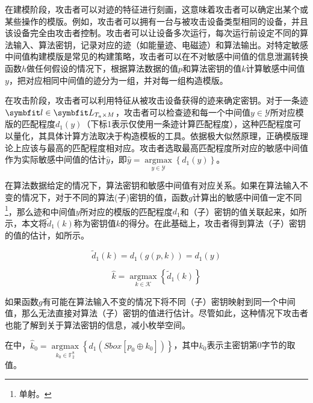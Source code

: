 {	在建模阶段，攻击者可以对迹的特征进行刻画，这意味着攻击者可以确定出某个或某些操作的模版。例如，攻击者可以拥有一台与被攻击设备类型相同的设备，并且该设备完全由攻击者控制。攻击者可以让设备多次运行，每次运行前设定不同的算法输入、算法密钥，记录对应的迹（如能量迹、电磁迹）和算法输出。对特定敏感中间值构建模版是常见的构建策略，攻击者可以在不对敏感中间值的信息泄漏转换函数$h$做任何假设的情况下，根据算法数据的值$p$和算法密钥的值$k$计算敏感中间值$y$，把对应相同中间值的迹分为一组，并对每一组构造模版。
	
	在攻击阶段，攻击者可以利用特征从被攻击设备获得的迹来确定密钥。对于一条迹$\Vector l\in \Vector L_{T_a\times M}$，攻击者可以检查迹和每一个中间值$y\in\mathcal Y$所对应模版的匹配程度$d_1(y)$（下标1表示仅使用一条迹计算匹配程度），这种匹配程度可以量化，其具体计算方法取决于构造模板的工具。依据极大似然原理，正确模版理论上应该与最高的匹配程度相对应\citep{Kay1998}。攻击者选取最高匹配程度所对应的敏感中间值作为实际敏感中间值的估计$\hat y$，即$\hat y=\mathop{\mathrm{argmax}}\limits_{y\in\mathcal Y}\left\lbrace d_1(y)\right\rbrace $。
	
	在算法数据给定的情况下，算法密钥和敏感中间值有对应关系。如果在算法输入不变的情况下，对于不同的算法(子)密钥的值，函数$g$计算出的敏感中间值一定不同\footnote{单射。}，那么迹和中间值$y$所对应的模版的匹配程度$d_1$和（子）密钥的值关联起来，如所示，本文将$\tilde d_1(k)$称为密钥值$k$的得分。在此基础上，攻击者得到算法（子）密钥的值的估计，如所示。
	
	\begin{equation}\label{eq:gsup-1}
		\tilde d_1(k)=d_1\left(g(p,k) \right)=d_1(y)
	\end{equation}
	
	\begin{equation}\label{eq:1tracek}
		\hat k=\mathop{\mathrm{argmax}}\limits_{k\in\mathcal K}\left\lbrace \tilde d_1(k)\right\rbrace 
	\end{equation}
	
	如果函数$g$有可能在算法输入不变的情况下将不同（子）密钥映射到同一个中间值，那么无法直接对算法（子）密钥的值进行估计。尽管如此，这种情况下攻击者也能了解到关于算法密钥的信息，减小枚举空间。
	
	\begin{example}
		在中，$\hat k_0=\mathop{\mathrm{argmax}}\limits_{k_0\in\mathbb F_2^8}\left\lbrace d_1\left(Sbox\left[p_0\oplus k_0\right]\right)\right\rbrace $，其中$k_0$表示主密钥第0字节的取值。
	\end{example}

}
